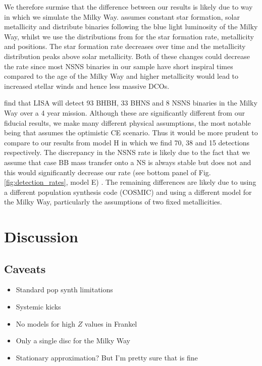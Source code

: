 \documentclass[twocolumn]{aastex63}
\newcommand{\modCaseBB}{E}
\newcommand{\modOpt}{H}
\begin{document}
We therefore surmise that the difference between our results is likely due to way in which we simulate the Milky Way. \citet{Lau+2020} assumes constant star formation, solar metallicity and distribute binaries following the blue light luminosity of the Milky Way, whilst we use the distributions from \citet{Frankel+2018} for the star formation rate, metallicity and positions. The \citet{Frankel+2018} star formation rate decreases over time and the metallicity distribution peaks above solar metallicity. Both of these changes could decrease the rate since most NSNS binaries in our sample have short inspiral times compared to the age of the Milky Way and higher metallicity would lead to increased stellar winds and hence less massive DCOs.

\citet{Breivik+2020} find that LISA will detect 93 BHBH, 33 BHNS and 8 NSNS binaries in the Milky Way over a 4 year mission. Although these are significantly different from our fiducial results, we make many different physical assumptions, the most notable being that \citet{Breivik+2020} assumes the optimistic CE scenario. Thus it would be more prudent to compare to our results from model \modOpt{} in which we find 70, 38 and 15 detections respectively. The discrepancy in the NSNS rate is likely due to the fact that we assume that case BB mass transfer onto a NS is always stable but \citet{Breivik+2020} does not and this would significantly decrease our rate (see bottom panel of Fig.\,\ref{fig:detection_rates}, model \modCaseBB{}) . The remaining differences are likely due to using a different population synthesis code (COSMIC) and using a different model for the Milky Way, particularly the assumptions of two fixed metallicities.

\section{Discussion} \label{sec:discussion}
\subsection{Caveats}
\begin{itemize}
    \item Standard pop synth limitations
    \item Systemic kicks
    \item No models for high $Z$ values in Frankel
    \item Only a single disc for the Milky Way
    \item Stationary approximation? But I'm pretty sure that is fine
\end{itemize}
\end{document}
